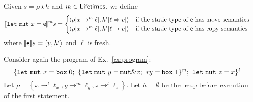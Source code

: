 \begin{definition}\label{def:semantics_declaration}
  Given $s=\rho\star h$ and $m\in\Lifetimes$, we define
  \[
  \denl[\mathtt{let\ mut}\ x=\mathsf{e}]{m}{s}=\begin{cases}
  \langle\rho[x\to^m\ell],h'[\ell\Rightarrow v]\rangle & \text{if the static type of $\mathsf{e}$ has move semantics}\\
  \langle\rho[x\to^m\ell],h'[\ell\to v]\rangle & \text{if the static type of $\mathsf{e}$ has copy semantics}
  \end{cases}
  \]
  where $\den[\mathsf{e}]{s}=\langle v,h'\rangle$ and $\ell$ is fresh.
\end{definition}

\begin{example}
  Consider again the program of Ex.~\ref{ex:program}:
  \[
    \{
      \mathtt{let\ mut}\ x = \mathtt{box}\ 0;\
      \{\mathtt{let\ mut}\ y = \mathtt{mut}\borrow x;\
      \mathtt{*}y = \mathtt{box}\ 1\}^m;\
      \mathtt{let\ mut}\ z = x
    \}^l
  \]
  Let $\rho=\left\{x\rightarrow^l\ell_x,
  y\rightarrow^m\ell_y,
  z\rightarrow^l\ell_z\right\}$.
  Let $h=\emptyset$ be the heap before execution of the first statement.
\end{example}
